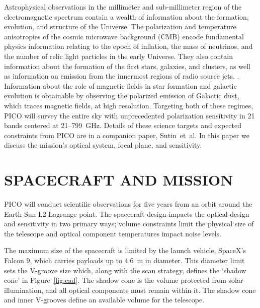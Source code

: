 \documentclass[]{spie}  %
\newcommand{\comb}[1]{\textcolor{blue}{#1}}
\begin{document}
Astrophysical observations in the  millimeter and sub-millimeter region of the electromagnetic spectrum contain a wealth of 
information about the formation, evolution, and structure of the Universe.  
The polarization and temperature anisotropies of the cosmic microwave 
background (CMB) encode fundamental physics information relating to the epoch of inflation, the mass of neutrinos,  
and the number of relic light particles in the early Universe. They also contain information about the formation of 
the first stars, galaxies, and clusters, as well as information on emission from the innermost regions of radio source jets.
.  Information about the role of magnetic fields in star formation and galactic evolution is obtainable 
by observing the polarized emission of Galactic dust, which 
traces magnetic fields, at high resolution. Targeting both of these regimes, PICO will survey the entire sky with 
unprecedented polarization sensitivity 
in 21 bands centered at 21--799~GHz.  Details of these science targets and expected constraints from PICO 
are in a companion paper, Sutin~et~al.\cite{brian_spie} 
In this paper we discuss the mission's optical system, focal plane, and sensitivity.



\section{SPACECRAFT AND MISSION}
\label{sec:spacecraft}


PICO will conduct scientific observations for five years from an orbit around the Earth-Sun L2 Lagrange point. The spacecraft design impacts 
the optical design and sensitivity in two primary ways; volume constraints limit the physical size of the telescope and optical component 
temperatures impact noise levels.  

The maximum size of the spacecraft is limited by the launch vehicle, SpaceX's Falcon 9, which carries payloads up to 4.6~m in diameter. 
This diameter limit sets the V-groove size which, along with the scan strategy, defines the `shadow cone' in Figure~\ref{fig:cad}.  
The shadow cone is the volume protected from solar illumination, and all optical components must remain within it. The shadow cone and 
inner V-grooves define an available volume for the telescope.  
\end{document}
